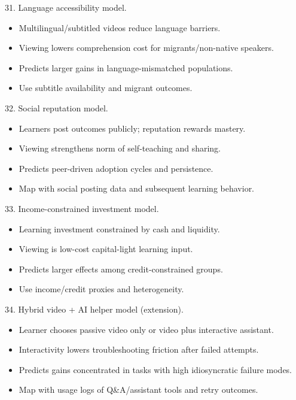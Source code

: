 \documentclass[11pt]{article}
\begin{document}
31. Language accessibility model.\\
\begin{itemize}
\item Multilingual/subtitled videos reduce language barriers.
\item Viewing lowers comprehension cost for migrants/non-native speakers.
\item Predicts larger gains in language-mismatched populations.
\item Use subtitle availability and migrant outcomes.
\end{itemize}

32. Social reputation model.\\
\begin{itemize}
\item Learners post outcomes publicly; reputation rewards mastery.
\item Viewing strengthens norm of self-teaching and sharing.
\item Predicts peer-driven adoption cycles and persistence.
\item Map with social posting data and subsequent learning behavior.
\end{itemize}

33. Income-constrained investment model.\\
\begin{itemize}
\item Learning investment constrained by cash and liquidity.
\item Viewing is low-cost capital-light learning input.
\item Predicts larger effects among credit-constrained groups.
\item Use income/credit proxies and heterogeneity.
\end{itemize}

34. Hybrid video + AI helper model (extension).\\
\begin{itemize}
\item Learner chooses passive video only or video plus interactive assistant.
\item Interactivity lowers troubleshooting friction after failed attempts.
\item Predicts gains concentrated in tasks with high idiosyncratic failure modes.
\item Map with usage logs of Q\&A/assistant tools and retry outcomes.
\end{itemize}
\end{document}
